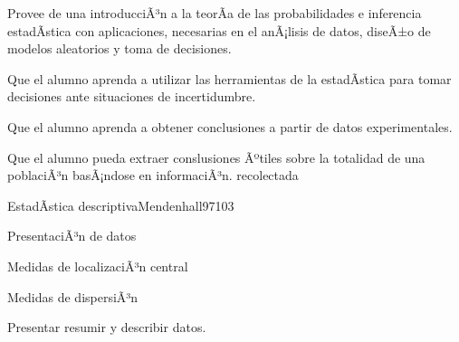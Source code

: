 
\begin{syllabus}


\begin{justification}
Provee de una introducciÃ³n a la teorÃ­a de las probabilidades e inferencia estadÃ­stica con aplicaciones, necesarias en el anÃ¡lisis de datos, diseÃ±o de modelos aleatorios y toma de decisiones.
\end{justification}

\begin{goals}
\item Que el alumno aprenda a utilizar las herramientas de la estadÃ­stica para tomar decisiones ante situaciones de incertidumbre.
\item Que el alumno aprenda a obtener conclusiones a partir de datos experimentales.
\item Que el alumno pueda extraer conslusiones Ãºtiles sobre la totalidad de una poblaciÃ³n basÃ¡ndose en informaciÃ³n. recolectada
\end{goals}

\begin{outcomes}
\end{outcomes}

\begin{unit}{EstadÃ­stica descriptiva}{Mendenhall97}{10}{3}
\begin{topics}
      \item PresentaciÃ³n de datos
      \item Medidas de localizaciÃ³n central
      \item Medidas de dispersiÃ³n
   \end{topics}

   \begin{learningoutcomes}
      \item Presentar resumir y describir datos.
   \end{learningoutcomes}
\end{unit}


\end{syllabus}
